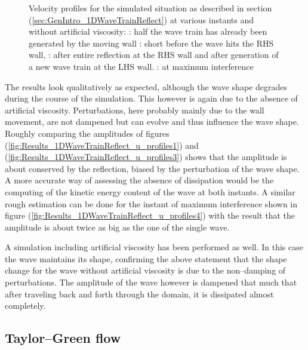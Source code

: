 \documentclass{report}
\begin{document}
\begin{figure}[h]
\caption[Velocity profiles 1D reflected wave train]{Velocity profiles for the simulated situation as described in section (\ref{sec:GenIntro_1DWaveTrainReflect}) at various instants and without artificial viscosity: : half the wave train has already been generated by the moving wall : short before the wave hits the RHS wall, : after entire reflection at the RHS wall and after generation of a new wave train at the LHS wall. : at maximum interference}

\end{figure}

The results look qualitatively as expected, although the wave shape degrades during the course of the simulation. This however is again due to the absence of artificial viscosity. Perturbations, here probably mainly due to the wall movement, are not dampened but can evolve and thus influence the wave shape. 
Roughly comparing the amplitudes of figures (\ref{fig:Results_1DWaveTrainReflect_u_profiles1}) and (\ref{fig:Results_1DWaveTrainReflect_u_profiles3}) shows that the amplitude is about conserved by the reflection, biased by the perturbation of the wave shape. A more accurate way of assessing the absence of dissipation would be the computing of the kinetic energy content of the wave at both instants.  
A similar rough estimation can be done for the instant of maximum interference shown in figure (\ref{fig:Results_1DWaveTrainReflect_u_profiles4}) with the result that the amplitude is about twice as big as the one of the single wave. 




A simulation including artificial viscosity has been performed as well. In this case the wave maintains its shape, confirming the above statement that the shape change for the wave without artificial viscosity is due to the non--damping of perturbations. 
The amplitude of the wave however is dampened that much that after traveling back and forth through the domain, it is dissipated almost completely.




\subsection{Taylor--Green flow}
\label{sec:Results_TG}
\end{document}
